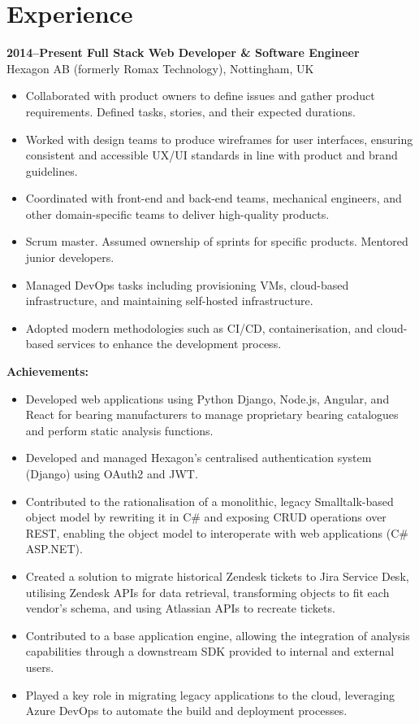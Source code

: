\documentclass{article}
\begin{document}
\section*{Experience}

\textbf{2014–Present Full Stack Web Developer \& Software Engineer} \\
Hexagon AB (formerly Romax Technology), Nottingham, UK
\begin{itemize}
    \item Collaborated with product owners to define issues and gather product requirements. Defined tasks, stories, and their expected durations.
    \item Worked with design teams to produce wireframes for user interfaces, ensuring consistent and accessible UX/UI standards in line with product and brand guidelines.
    \item Coordinated with front-end and back-end teams, mechanical engineers, and other domain-specific teams to deliver high-quality products.
    \item Scrum master. Assumed ownership of sprints for specific products. Mentored junior developers.
    \item Managed DevOps tasks including provisioning VMs, cloud-based infrastructure, and maintaining self-hosted infrastructure.
    \item Adopted modern methodologies such as CI/CD, containerisation, and cloud-based services to enhance the development process.
\end{itemize}

\textbf{Achievements:}
\begin{itemize}
    \item Developed web applications using Python Django, Node.js, Angular, and React for bearing manufacturers to manage proprietary bearing catalogues and perform static analysis functions.
    \item Developed and managed Hexagon’s centralised authentication system (Django) using OAuth2 and JWT.
    \item Contributed to the rationalisation of a monolithic, legacy Smalltalk-based object model by rewriting it in C\# and exposing CRUD operations over REST, enabling the object model to interoperate with web applications (C\# ASP.NET).
    \item Created a solution to migrate historical Zendesk tickets to Jira Service Desk, utilising Zendesk APIs for data retrieval, transforming objects to fit each vendor’s schema, and using Atlassian APIs to recreate tickets.
    \item Contributed to a base application engine, allowing the integration of analysis capabilities through a downstream SDK provided to internal and external users.
    \item Played a key role in migrating legacy applications to the cloud, leveraging Azure DevOps to automate the build and deployment processes.
\end{itemize}
\end{document}
